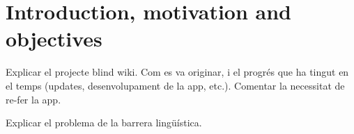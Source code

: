 \section{Introduction, motivation and objectives}

Explicar el projecte blind wiki. Com es va originar, i el progrés que ha tingut en el temps (updates, desenvolupament de la app, etc.). Comentar la necessitat de re-fer la app.

Explicar el problema de la barrera lingüística.
